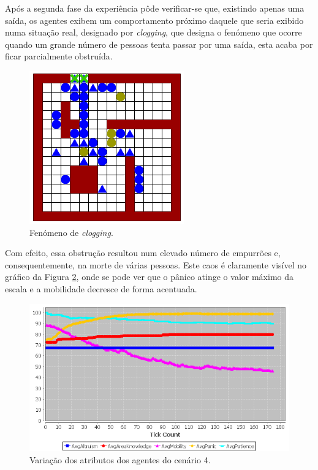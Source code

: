 \documentclass[12pt]{article}
\begin{document}
\begin{titlepage}
\begin{itemize}
Após a segunda fase da experiência pôde verificar-se que, existindo apenas uma saída, os agentes exibem um comportamento próximo daquele que seria exibido numa situação real, designado por \textit{clogging}, que designa o fenómeno que ocorre quando um grande número de pessoas tenta passar por uma saída, esta acaba por ficar parcialmente obstruída. 

\begin{figure}[H]
	\centering
	\includegraphics[scale=1.1]{clogging.png}
	\caption{Fenómeno de \textit{clogging}.}
	\label{clog}
\end{figure}

Com efeito, essa obstrução resultou num elevado número de empurrões e, consequentemente, na morte de várias pessoas. Este caos é claramente visível no gráfico da Figura \ref{graph_sc4}, onde se pode ver que o pânico atinge o valor máximo da escala e a mobilidade decresce de forma acentuada.

\begin{figure}[H]
	\centering
	\includegraphics{graph_sc4.png}
	\caption{Variação dos atributos dos agentes do cenário 4.}
	\label{graph_sc4}
\end{figure}


\end{itemize}
\end{titlepage}
\end{document}
